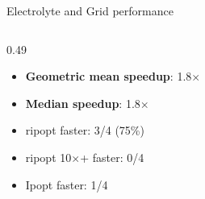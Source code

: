 \documentclass{beamer}
\begin{document}
\begin{frame}{Electrolyte and Grid performance}
\begin{columns}[T,onlytextwidth]
\begin{column}{0.49\textwidth}
      \vspace{0.5em}
      \raggedright
      \begin{itemize}
        \item \textbf{Geometric mean speedup}: 1.8$\times$
        \item \textbf{Median speedup}: 1.8$\times$
        \item ripopt faster: 3/4 (75\%)
        \item ripopt 10$\times$+ faster: 0/4
        \item Ipopt faster: 1/4
      \end{itemize}
    \end{column}
  \end{columns}

\end{frame}
\end{document}
